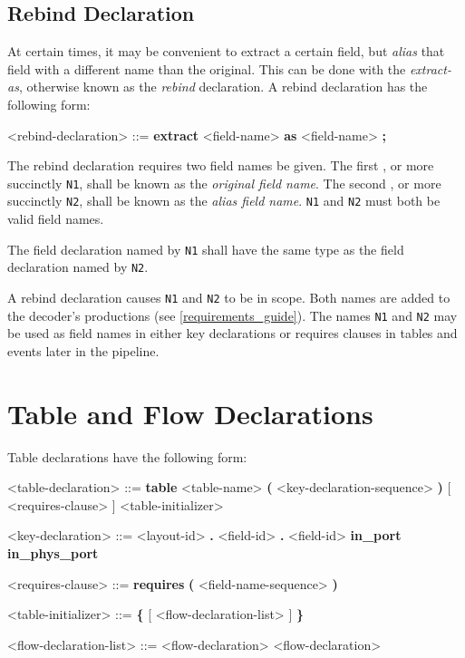 \subsection{Rebind Declaration} \label{rebind_guide}

At certain times, it may be convenient to extract a certain field, but \textit{alias} that field with a different name than the original. This can be done with the \textit{extract-as}, otherwise known as the \textit{rebind} declaration. A rebind declaration has the following form:

\begin{minip}
\begin{grammar}
<rebind-declaration> ::=
\textbf{extract} <field-name> \textbf{as} <field-name> \textbf{;}
\end{grammar}
\end{minip}

The rebind declaration requires two field names be given. The first , or more succinctly \texttt{N1}, shall be known as the \textit{original field name}. The second , or more succinctly \texttt{N2}, shall be known as the \textit{alias field name}. \texttt{N1} and \texttt{N2} must both be valid field names.

The field declaration named by \texttt{N1} shall have the same type as the field declaration named by \texttt{N2}. 

A rebind declaration causes \texttt{N1} and \texttt{N2} to be in scope. Both names are added to the decoder's productions (see \ref{requirements_guide}). The names \texttt{N1} and \texttt{N2} may be used as field names in either key declarations or requires clauses in tables and events later in the pipeline. 

\section{Table and Flow Declarations} \label{table_guide}

Table declarations have the following form:

\begin{minip}
\begin{grammar}
<table-declaration> ::=
\textbf{table} <table-name> \textbf{(} <key-declaration-sequence> \textbf{)} 
[ <requires-clause> ] <table-initializer>

<key-declaration> ::=
<layout-id> \textbf{.} <field-id>
 \textbf{.} <field-id>
\alt \textbf{in\_port}
\alt \textbf{in\_phys\_port}

<requires-clause> ::=
\textbf{requires} \textbf{(} <field-name-sequence> \textbf{)}

<table-initializer> ::= \textbf{\{} [ <flow-declaration-list> ] \textbf{\}} 

<flow-declaration-list> ::= <flow-declaration> 
 <flow-declaration>
\end{grammar}
\end{minip}

